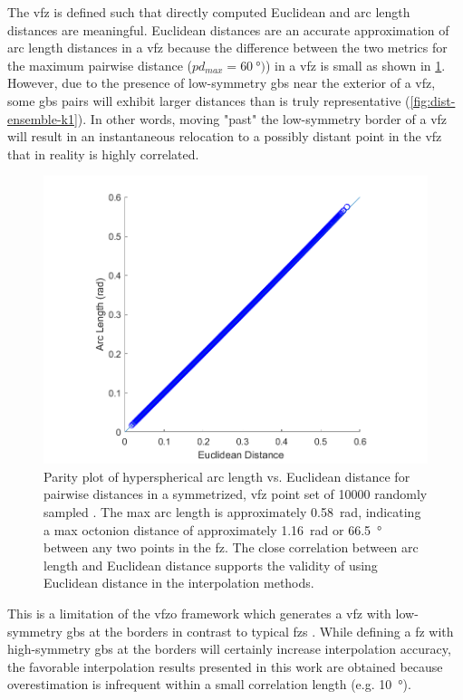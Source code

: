 \documentclass[preprint,12pt]{elsarticle}
\begin{document}
The \gls{vfz} is defined such that directly computed Euclidean and arc length distances are meaningful. Euclidean distances are an accurate approximation of arc length distances in a \gls{vfz} because the difference between the two metrics for the maximum pairwise distance ($pd_{max} = \SI{60}{\degree})$) in a \gls{vfz} is small as shown in \cref{fig:dist-parity}. However, due to the presence of low-symmetry \glspl{gb} near the exterior of a \gls{vfz}, some \glspl{gb} pairs will exhibit larger distances than is truly representative (\cref{fig:dist-ensemble-k1}). In other words, moving "past" the low-symmetry border of a \gls{vfz} will result in an instantaneous relocation to a possibly distant point in the \gls{vfz} that in reality is highly correlated.

\begin{figure}
\centering
\includegraphics[scale=1]{dist-parity.png}
\caption{Parity plot of hyperspherical arc length vs. Euclidean distance for pairwise distances in a symmetrized, \gls{vfz} point set of \num{10000} randomly sampled . The max arc length is approximately \SI{0.58}{\radian}, indicating a max octonion distance of approximately \SI{1.16}{\radian} or \SI{66.5}{\degree} between any two points in the \acrlong{fz}. The close correlation between arc length and Euclidean distance supports the validity of using Euclidean distance in the interpolation methods.}
\label{fig:dist-parity}
\end{figure}

This is a limitation of the \gls{vfzo} framework which generates a \gls{vfz} with low-symmetry \glspl{gb} at the borders in contrast to typical \glspl{fz} \cite{patalaSymmetriesRepresentationGrain2013,homerGrainBoundaryPlane2015}. While defining a \gls{fz} with high-symmetry \glspl{gb} at the borders will certainly increase interpolation accuracy, the favorable interpolation results presented in this work are obtained because overestimation is infrequent within a small correlation length (e.g. \SI{10}{\degree}).
\end{document}
